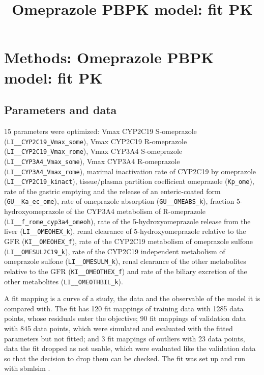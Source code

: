 \documentclass{article}
\title{Omeprazole PBPK model: fit PK}
\date{}
\begin{document}
\maketitle

\section{Methods: Omeprazole PBPK model: fit PK}

\subsection{Parameters and data}

15 parameters were optimized: Vmax CYP2C19 S-omeprazole (\texttt{LI\_\_CYP2C19\_Vmax\_some}), Vmax CYP2C19 R-omeprazole (\texttt{LI\_\_CYP2C19\_Vmax\_rome}), Vmax CYP3A4 S-omeprazole (\texttt{LI\_\_CYP3A4\_Vmax\_some}), Vmax CYP3A4 R-omeprazole (\texttt{LI\_\_CYP3A4\_Vmax\_rome}), maximal inactivation rate of CYP2C19 by omeprazole (\texttt{LI\_\_CYP2C19\_kinact}), tissue/plasma partition coefficient omeprazole (\texttt{Kp\_ome}), rate of the gastric emptying and the release of an enteric-coated form (\texttt{GU\_\_Ka\_ec\_ome}), rate of omeprazole absorption (\texttt{GU\_\_OMEABS\_k}), fraction 5-hydroxyomeprazole of the CYP3A4 metabolism of R-omeprazole (\texttt{LI\_\_f\_rome\_cyp3a4\_omeoh}), rate of the 5-hydroxyomeprazole release from the liver (\texttt{LI\_\_OMEOHEX\_k}), renal clearance of 5-hydroxyomeprazole relative to the GFR (\texttt{KI\_\_OMEOHEX\_f}), rate of the CYP2C19 metabolism of omeprazole sulfone (\texttt{LI\_\_OMESUL2C19\_k}), rate of the CYP2C19 independent metabolism of omeprazole sulfone (\texttt{LI\_\_OMESULM\_k}), renal clearance of the other metabolites relative to the GFR (\texttt{KI\_\_OMEOTHEX\_f}) and rate of the biliary excretion of the other metabolites (\texttt{LI\_\_OMEOTHBIL\_k}).

A fit mapping is a curve of a study, the data and the observable of the model it is compared with. The fit has 120 fit mappings of training data with 1285 data points, whose residuals enter the objective; 90 fit mappings of validation data with 845 data points, which were simulated and evaluated with the fitted parameters but not fitted; and 3 fit mappings of outliers with 23 data points, data the fit dropped as not usable, which were evaluated like the validation data so that the decision to drop them can be checked. The fit was set up and run with sbmlsim \cite{Koenig2026_sbmlsim}.
\end{document}
